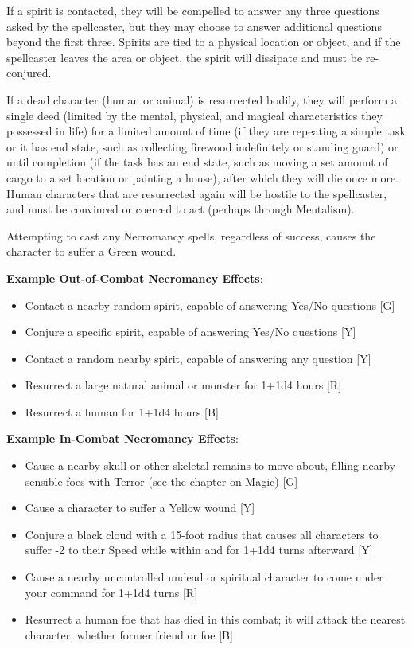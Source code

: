 \documentclass[oneside]{book}
\begin{document}
\begin{multicols}{2}
If a spirit is contacted, they will be compelled to answer any three questions asked by the spellcaster, but they may choose to answer additional questions beyond the first three. Spirits are tied to a physical location or object, and if the spellcaster leaves the area or object, the spirit will dissipate and must be re-conjured.
 
If a dead character (human or animal) is resurrected bodily, they will perform a single deed (limited by the mental, physical, and magical characteristics they possessed in life) for a limited amount of time (if they are repeating a simple task or it has end state, such as collecting firewood indefinitely or standing guard) or until completion (if the task has an end state, such as moving a set amount of cargo to a set location or painting a house), after which they will die once more. Human characters that are resurrected again will be hostile to the spellcaster, and must be convinced or coerced to act (perhaps through Mentalism). 

Attempting to cast any Necromancy spells, regardless of success, causes the character to suffer a Green wound.

\textbf{Example Out-of-Combat Necromancy Effects}:
	\begin{itemize}
		\setlength{\itemsep}{0cm}%
  		\setlength{\parskip}{0cm}%
		\item{ \small Contact a nearby random spirit, capable of answering Yes/No questions  [G]}
		\item{ \small Conjure a specific spirit, capable of answering Yes/No questions [Y]}
		\item{ \small Contact a random nearby spirit, capable of answering any question [Y]}
		\item{ \small Resurrect a large natural animal or monster for 1+1d4 hours [R]}
		\item{ \small Resurrect a human for 1+1d4 hours [B]}
	\end{itemize}
	
\textbf{Example In-Combat Necromancy Effects}:
	\begin{itemize}
		\setlength{\itemsep}{0cm}%
  		\setlength{\parskip}{0cm}%
		\item{ \small Cause a nearby skull or other skeletal remains to move about, filling nearby sensible foes with Terror (see the chapter on Magic)  [G]}
		\item{ \small Cause a character to suffer a Yellow wound  [Y]}
		\item{ \small Conjure a black cloud with a 15-foot radius that causes all characters to suffer -2 to their Speed while within and for 1+1d4 turns afterward [Y]}
		\item{ \small Cause a nearby uncontrolled undead or spiritual character to come under your command for 1+1d4 turns [R]}
		\item{ \small Resurrect a human foe that has died in this combat; it will attack the nearest character, whether former friend or foe [B]}
	\end{itemize}
 

\end{multicols}
\end{document}
